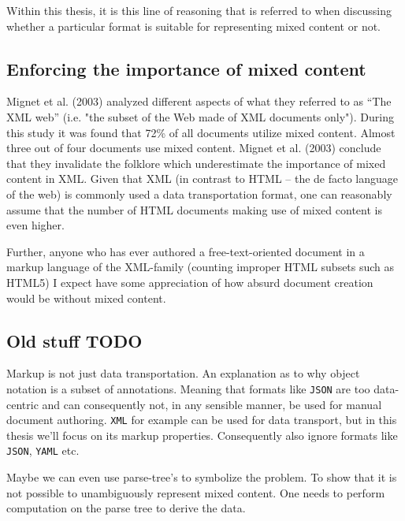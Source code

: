 \documentclass{scrreprt}
\begin{document}
Within this thesis, it is this line of reasoning that is referred to when discussing whether a particular format is suitable for representing mixed content or not.




\subsection{Enforcing the importance of mixed content}

Mignet et al. (2003) analyzed different aspects of what they referred to as ``The XML web'' (i.e. "the subset of the Web made of XML documents only"). During this study it was found that 72\% of all documents utilize mixed content. Almost three out of four documents use mixed content. Mignet et al. (2003) conclude that they invalidate the folklore which underestimate the importance of mixed content in XML. Given that XML (in contrast to HTML -- the de facto language of the web) is commonly used a data transportation format, one can reasonably assume that the number of HTML documents making use of mixed content is even higher.



Further, anyone who has ever authored a free-text-oriented document in a markup language of the XML-family (counting improper HTML subsets such as HTML5) I expect have some appreciation of how absurd document creation would be without mixed content.





\subsection{Old stuff TODO}
Markup is not just data transportation. An explanation as to why object notation is a subset of annotations. Meaning that formats like \texttt{JSON} are too data-centric and can consequently not, in any sensible manner, be used for manual document authoring. \texttt{XML} for example can be used for data transport, but in this thesis we'll focus on its markup properties. Consequently also ignore formats like \texttt{JSON}, \texttt{YAML} etc.

Maybe we can even use parse-tree's to symbolize the problem. To show that it is not possible to unambiguously represent mixed content. One needs to perform computation on the parse tree to derive the data.
\end{document}
